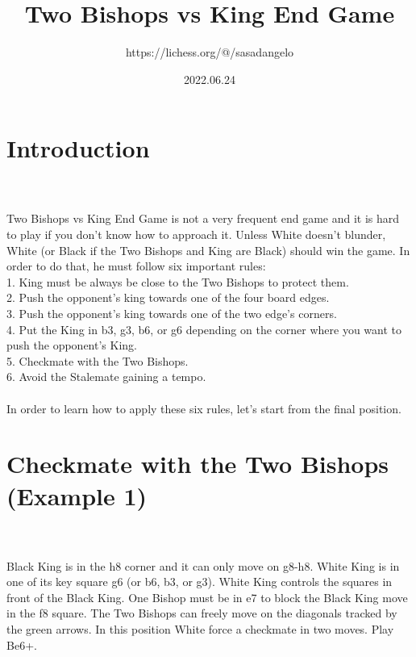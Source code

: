 \documentclass{article}
\title{Two Bishops vs King End Game}
\author{https://lichess.org/@/sasadangelo}
\date{2022.06.24}
\begin{document}
\begin{titlepage}
\maketitle
\end{titlepage}
\section{ Introduction}

\\
\\
Two Bishops vs King End Game is not a very frequent end game and it is hard to play if you don't know how to approach it. Unless White doesn't blunder, White (or Black if the Two Bishops and King are Black) should win the game. In order to do that, he must follow six important rules:\\1. King must be always be close to the Two Bishops to protect them.\\2. Push the opponent's king towards one of the four board edges.\\3. Push the opponent's king towards one of the two edge's corners.\\4. Put the King in b3, g3, b6, or g6 depending on the corner where you want to push the opponent's King.\\5. Checkmate with the Two Bishops.\\6. Avoid the Stalemate gaining a tempo.\\\\In order to learn how to apply these six rules, let's start from the final position.\section{ Checkmate with the Two Bishops (Example 1)}

\\
\\
Black King is in the h8 corner and it can only move on g8-h8. White King is in one of its key square g6 (or b6, b3, or g3). White King controls the squares in front of the Black King. One Bishop must be in e7 to block the Black King move in the f8 square. The Two Bishops can freely move on the diagonals tracked by the green arrows. In this position White force a checkmate in two moves. Play Be6+.\\\\
\\
\end{document}
